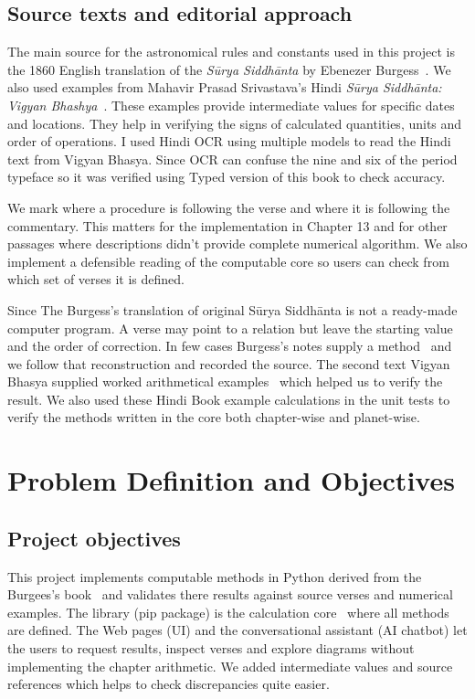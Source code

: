 \documentclass[12pt,a4paper,oneside]{report}
\newcommand{\surya}{Sūrya Siddhānta\xspace}
\begin{document}
\section{Source texts and editorial approach}

The main source for the astronomical rules and constants used in this project is the 1860 English translation of the \emph{\surya} by Ebenezer Burgess~\cite{burgess1860}. We also used examples from Mahavir Prasad Srivastava's Hindi \emph{\surya: Vigyan Bhashya}~\cite{shrivastava}. These examples provide intermediate values for specific dates and locations. They help in verifying the signs of calculated quantities, units and order of operations. I used Hindi OCR using multiple models to read the Hindi text from Vigyan Bhasya. Since OCR can confuse the nine and six of the period typeface so it was verified using Typed version of this book to check accuracy.

We mark where a procedure is following the verse and where it is following the commentary. This matters for the implementation in Chapter 13 and for other passages where descriptions didn't provide complete numerical algorithm. We also implement a defensible reading of the computable core so users can check from which set of verses it is defined.

Since The Burgess's translation of original \surya is not a ready-made computer program. A verse may point to a relation but leave the starting value and the order of correction. In few cases Burgess's notes supply a method~\cite{burgess1860} and we follow that reconstruction and recorded the source. The second text Vigyan Bhasya supplied worked arithmetical examples~\cite{shrivastava} which helped us to verify the result. We also used these Hindi Book example calculations in the unit tests to verify the methods written in the core both chapter-wise and planet-wise.

\chapter{Problem Definition and Objectives}

\section{Project objectives}

This project implements computable methods in Python derived from the Burgees's book~\cite{burgess1860} and validates there results against source verses and numerical examples. The library (pip package) is the calculation core~\cite{suryasiddhanta} where all methods are defined. The Web pages (UI) and the conversational assistant (AI chatbot) let the users to request results, inspect verses and explore diagrams without implementing the chapter arithmetic. We added intermediate values and source references which helps to check discrepancies quite easier.
\end{document}
